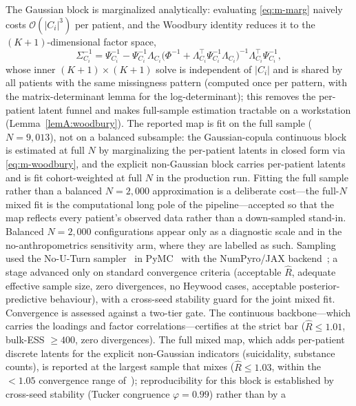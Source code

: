 The Gaussian block is marginalized analytically: evaluating \eqref{eq:m-marg} naively costs
$\mathcal{O}(|C_i|^3)$ per patient, and the Woodbury identity reduces it to the
$(K{+}1)$-dimensional factor space,
\begin{equation}
  \Sigma_{C_i}^{-1}=\Psi_{C_i}^{-1}-\Psi_{C_i}^{-1}\Lambda_{C_i}
  \big(\Phi^{-1}+\Lambda_{C_i}^{\top}\Psi_{C_i}^{-1}\Lambda_{C_i}\big)^{-1}
  \Lambda_{C_i}^{\top}\Psi_{C_i}^{-1},
  \label{eq:m-woodbury}
\end{equation}
whose inner $(K{+}1)\times(K{+}1)$ solve is independent of $|C_i|$ and is shared by all
patients with the same missingness pattern (computed once per pattern, with the
matrix-determinant lemma for the log-determinant); this removes the per-patient latent funnel
and makes full-sample estimation tractable on a workstation (Lemma~\ref{lemA:woodbury}).
The reported map is fit on the full sample ($N=9{,}013$), not on a balanced subsample: the
Gaussian-copula continuous block is estimated at full $N$ by marginalizing the per-patient
latents in closed form via \eqref{eq:m-woodbury}, and the explicit non-Gaussian block
carries per-patient latents and is fit cohort-weighted at full $N$ in the production run.
Fitting the full sample rather than a balanced $N=2{,}000$ approximation is a deliberate
cost---the full-$N$ mixed fit is the computational long pole of the pipeline---accepted so
that the map reflects every patient's observed data rather than a down-sampled stand-in.
Balanced $N=2{,}000$ configurations appear only as a diagnostic scale and in the
no-anthropometrics sensitivity arm, where they are labelled as such.
Sampling used the No-U-Turn sampler~\citep{hoffman2014nuts}
in PyMC~\citep{abrilpla2023pymc} with the NumPyro/JAX backend~\citep{phan2019numpyro};
a stage advanced only on standard convergence criteria (acceptable $\hat R$, adequate
effective sample size, zero divergences, no Heywood cases, acceptable
posterior-predictive behaviour), with a cross-seed stability guard for the joint mixed
fit. Convergence is assessed against a two-tier gate. The continuous backbone---which
carries the loadings and factor correlations---certifies at the strict bar ($\hat R\le
1.01$, bulk-ESS $\ge400$, zero divergences). The full mixed map, which adds per-patient
discrete latents for the explicit non-Gaussian indicators (suicidality, substance
counts), is reported at the largest sample that mixes ($\hat R\le1.03$, within the
$<1.05$ convergence range of~\citep{vehtari2017loo}); reproducibility for this block is
established by cross-seed stability (Tucker congruence $\varphi=0.99$) rather than by a
